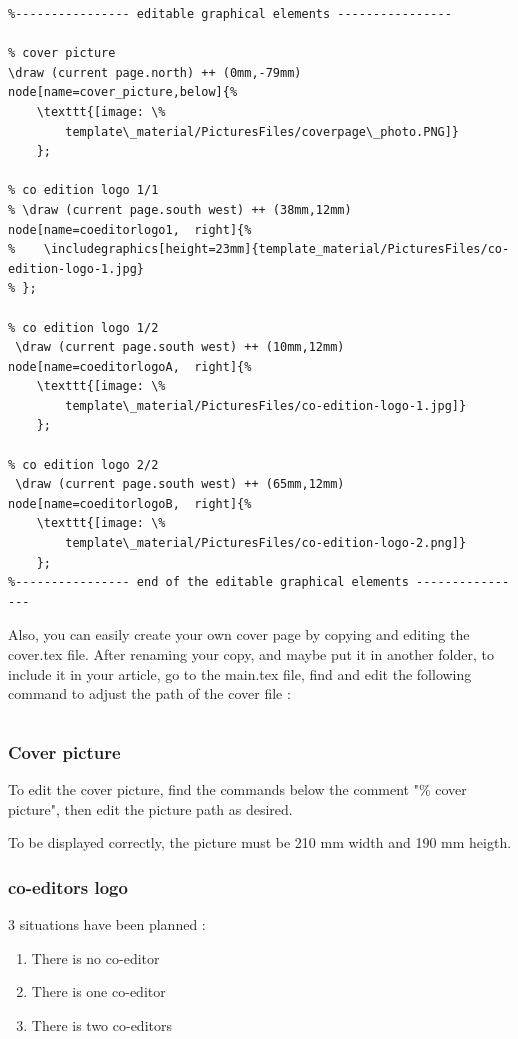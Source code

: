 \documentclass[Theme1]{{template_material/eurostat}}
\begin{document}
\begin{verbatim}
%---------------- editable graphical elements ----------------
    
% cover picture
\draw (current page.north) ++ (0mm,-79mm) node[name=cover_picture,below]{%
    \texttt{[image: \%
        template\_material/PicturesFiles/coverpage\_photo.PNG]}
    };

% co edition logo 1/1
% \draw (current page.south west) ++ (38mm,12mm) node[name=coeditorlogo1,  right]{%
%    \includegraphics[height=23mm]{template_material/PicturesFiles/co-edition-logo-1.jpg}
% }; 
     
% co edition logo 1/2
 \draw (current page.south west) ++ (10mm,12mm) node[name=coeditorlogoA,  right]{%
    \texttt{[image: \%
        template\_material/PicturesFiles/co-edition-logo-1.jpg]}
    }; 
     
% co edition logo 2/2
 \draw (current page.south west) ++ (65mm,12mm) node[name=coeditorlogoB,  right]{%
    \texttt{[image: \%
        template\_material/PicturesFiles/co-edition-logo-2.png]}
    }; 
%---------------- end of the editable graphical elements ----------------
\end{verbatim}

Also, you can easily create your own cover page by copying and editing the cover.tex file. After renaming your copy, and maybe put it in another folder, to include it in your article, go to the main.tex file, find and edit the following command to adjust the path of the cover file :
\begin{verbatim}

\end{verbatim}

\subsubsection{Cover picture}

To edit the cover picture, find the  commands below the comment "\% cover picture", then edit the picture path as desired.

To be displayed correctly, the picture must be 210 mm width and 190 mm heigth. 

\subsubsection{co-editors logo}

3 situations have been planned :
\begin{enumerate}
    \item There is no co-editor
    \item There is one co-editor
    \item There is two co-editors
\end{enumerate}
\end{document}
